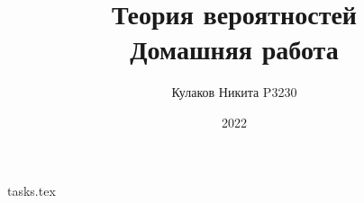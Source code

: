 
\title{Теория вероятностей\\ Домашняя работа}
\date{2022}
\author{Кулаков Никита P3230}



\maketitle

\begin{sloppypar}
\tableofcontents
\newpage
{tasks.tex}
\end{sloppypar}

